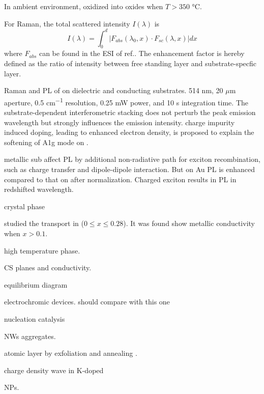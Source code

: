 In ambient environment,  oxidized into oxides when $T > 350$ \si{\degreeCelsius}.\cite{Su2014a} 

For Raman, the total scattered intensity $I(\lambda)$ is 
\[
I(\lambda) = \int_0^d |F_{abs}(\lambda_0,x)\cdot F_{sc}(\lambda, x)|dx
\]
where $F_{abs}$ can be found in the ESI of ref.\cite{Buscema2014}. The enhancement factor is hereby defined as the ratio of intensity between free standing layer and substrate-specfic layer. 

Raman and PL of  on dielectric and conducting substrates. 514 nm, 20 $\mu$m aperture, 0.5 \si{cm^{-1}} resolution, 0.25 mW power, and 10 s integration time. \cite{Buscema2014} The substrate-dependent interferometric stacking does not perturb the peak emission wavelength but strongly influences the emission intensity.  charge impurity induced doping, leading to enhanced electron density, is proposed to explain the softening of A1g mode on . 

metallic sub affect PL by additional non-radiative path for exciton recombination, such as charge transfer and dipole-dipole interaction. But on Au  PL is enhanced compared to that on  after normalization. Charged exciton results in PL in redshifted wavelength. 


 crystal phase \cite{Viswanathan1974}

\citeauthor{Salje1984} studied the transport in  ($0\leq x \leq 0.28$).\cite{Salje1984} It was found  show metallic conductivity when $x > 0.1$.

 \cite{Migas2010}

 high temperature phase. \cite{Vogt1999}


 CS planes and conductivity.\cite{Sahle1983}

 equilibrium diagram \cite{Wriedt1989}

 electrochromic devices.\cite{Liu2013d} should compare with this one \cite{Wang2008}

nucleation catalysis \cite{Turnbull1952}

 NWs aggregates. \cite{Kozan2008a}

 atomic layer by exfoliation and annealing . \cite{Kalantar-zadeh2010a}



charge density wave in K-doped  \cite{Raj2008}

 NPs. \cite{Frey2001}

